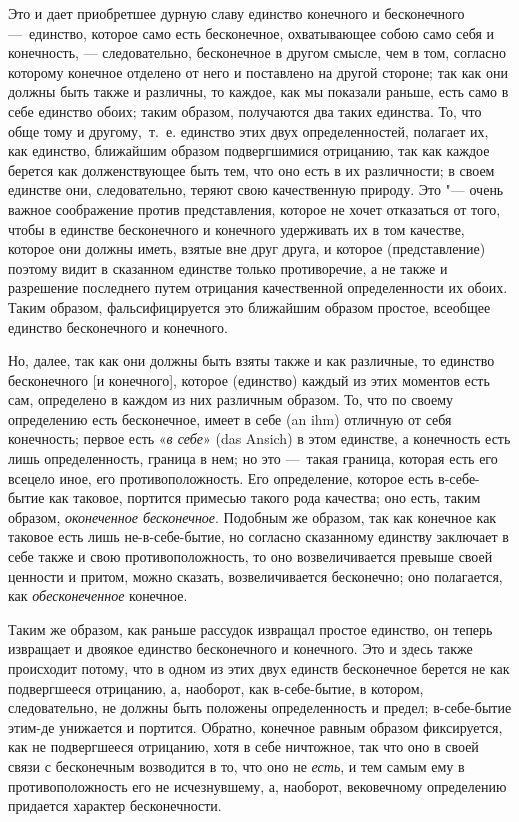 Это и дает приобретшее дурную славу единство конечного и бесконечного
—~единство, которое само есть бесконечное, охватывающее собою само себя и
конечность, — следовательно, бесконечное в другом смысле, чем в том,
согласно которому конечное отделено от него и поставлено на другой стороне;
так как они должны быть также и различны, то каждое, как мы показали
раньше, есть само в себе единство обоих; таким образом, получаются два
таких единства. То, что обще тому и другому,~т.~е. единство этих двух
определенностей, полагает их, как единство, ближайшим образом подвергшимися
отрицанию, так как каждое берется как долженствующее быть тем, что оно есть
в их различности; в своем единстве они, следовательно, теряют свою
качественную природу. Это "--- очень важное соображение против представления,
которое не хочет отказаться от того, чтобы в единстве бесконечного и
конечного удерживать их в том качестве, которое они должны иметь, взятые
вне друг друга, и которое (представление) поэтому видит в сказанном
единстве только противоречие, а не также и разрешение последнего путем
отрицания качественной определенности их обоих. Таким образом,
фальсифицируется это ближайшим образом простое, всеобщее единство
бесконечного и конечного.

Но, далее, так как они должны быть взяты также и как различные, то единство
бесконечного [и конечного], которое (единство) каждый из этих моментов есть
сам, определено в каждом из них различным образом. То, что по своему
определению есть бесконечное, имеет в себе (an ihm) отличную от себя
конечность; первое есть «{\em в себе}» (das Ansich) в
этом единстве, а конечность есть лишь определенность, граница в нем; но это
—~такая граница, которая есть его всецело иное, его
противоположность. Его определение, которое есть в-себе-бытие как таковое,
портится примесью такого рода качества; оно есть, таким образом,
{\em оконеченное бесконечное}. Подобным же образом, так
как конечное как таковое есть лишь не-в-себе-бытие, но согласно сказанному
единству заключает в себе также и свою противоположность, то оно
возвеличивается превыше своей ценности и притом, можно сказать,
возвеличивается бесконечно; оно полагается, как
{\em обесконеченное} конечное.

Таким же образом, как раньше рассудок извращал простое единство, он
теперь извращает и двоякое единство бесконечного и конечного.
Это и здесь также происходит потому, что в одном из этих двух единств
бесконечное берется не как подвергшееся отрицанию, а, наоборот, как
в-себе-бытие, в котором, следовательно, не должны быть положены
определенность и предел; в-себе-бытие этим-де унижается и портится.
Обратно, конечное равным образом фиксируется, как не подвергшееся
отрицанию, хотя в себе ничтожное, так что оно в своей связи с бесконечным
возводится в то, что оно не {\em есть}, и тем самым ему
в противоположность его не исчезнувшему, а, наоборот, вековечному
определению придается характер бесконечности.

